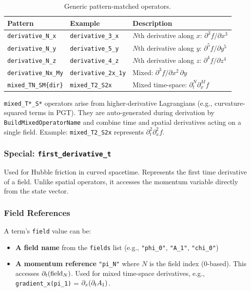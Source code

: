 \begin{table}[htbp]
\centering
\caption{Generic pattern-matched operators.}
\label{tab:json-generic-operators}
\begin{tabular}{@{}lll@{}}
\toprule
Pattern & Example & Description \\
\midrule
\texttt{derivative\_N\_x}   & \texttt{derivative\_3\_x}   & $N$th derivative along $x$: $\partial^3 f / \partial x^3$ \\
\texttt{derivative\_N\_y}   & \texttt{derivative\_5\_y}   & $N$th derivative along $y$: $\partial^5 f / \partial y^5$ \\
\texttt{derivative\_N\_z}   & \texttt{derivative\_4\_z}   & $N$th derivative along $z$: $\partial^4 f / \partial z^4$ \\
\texttt{derivative\_Nx\_My} & \texttt{derivative\_2x\_1y} & Mixed: $\partial^3 f / \partial x^2\, \partial y$ \\
\texttt{mixed\_TN\_SM\{dir\}}  & \texttt{mixed\_T2\_S2x}     & Mixed time-space: $\partial^N_t \partial^M_x f$ \\
\bottomrule
\end{tabular}
\end{table}

\texttt{mixed\_T*\_S*} operators arise from higher-derivative Lagrangians (e.g., curvature-squared terms in PGT). They are auto-generated during derivation by \texttt{BuildMixedOperatorName} and combine time and spatial derivatives acting on a single field. Example: \texttt{mixed\_T2\_S2x} represents $\partial_t^2 \partial_x^2 f$.

\subsubsection{Special: \texttt{first\_derivative\_t}}
\label{sec:json-first-derivative-t}

Used for Hubble friction in curved spacetime. Represents the first time derivative of a field. Unlike spatial operators, it accesses the momentum variable directly from the state vector.

\subsubsection{Field References}
\label{sec:json-field-references}

A term's \texttt{field} value can be:
\begin{itemize}
  \item \textbf{A field name} from the \texttt{fields} list (e.g., \texttt{"phi\_0"}, \texttt{"A\_1"}, \texttt{"chi\_0"})
  \item \textbf{A momentum reference} \texttt{"pi\_N"} where $N$ is the field index (0-based). This accesses $\partial_t(\text{field}_N)$. Used for mixed time-space derivatives, e.g., \texttt{gradient\_x(pi\_1)} = $\partial_x(\partial_t A_1)$.
\end{itemize}

